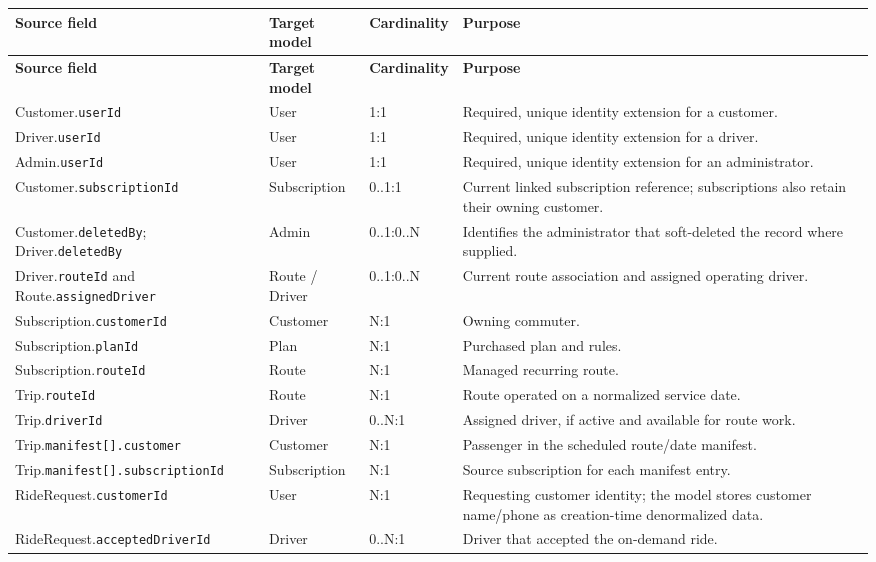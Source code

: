 \documentclass[11pt,a4paper]{article}
\newcommand{\code}[1]{\texttt{#1}}
\begin{document}
\begin{longtable}{p{} p{} p{} p{}}
\toprule
\textbf{Source field} & \textbf{Target model} & \textbf{Cardinality} & \textbf{Purpose} \\
\midrule
\endfirsthead
\toprule
\textbf{Source field} & \textbf{Target model} & \textbf{Cardinality} & \textbf{Purpose} \\
\midrule
\endhead
Customer.\code{userId} & User & 1:1 & Required, unique identity extension for a customer. \\
Driver.\code{userId} & User & 1:1 & Required, unique identity extension for a driver. \\
Admin.\code{userId} & User & 1:1 & Required, unique identity extension for an administrator. \\
Customer.\code{subscriptionId} & Subscription & 0..1:1 & Current linked subscription reference; subscriptions also retain their owning customer. \\
Customer.\code{deletedBy}; Driver.\code{deletedBy} & Admin & 0..1:0..N & Identifies the administrator that soft-deleted the record where supplied. \\
Driver.\code{routeId} and Route.\code{assignedDriver} & Route / Driver & 0..1:0..N & Current route association and assigned operating driver. \\
Subscription.\code{customerId} & Customer & N:1 & Owning commuter. \\
Subscription.\code{planId} & Plan & N:1 & Purchased plan and rules. \\
Subscription.\code{routeId} & Route & N:1 & Managed recurring route. \\
Trip.\code{routeId} & Route & N:1 & Route operated on a normalized service date. \\
Trip.\code{driverId} & Driver & 0..N:1 & Assigned driver, if active and available for route work. \\
Trip.\code{manifest[].customer} & Customer & N:1 & Passenger in the scheduled route/date manifest. \\
Trip.\code{manifest[].subscriptionId} & Subscription & N:1 & Source subscription for each manifest entry. \\
RideRequest.\code{customerId} & User & N:1 & Requesting customer identity; the model stores customer name/phone as creation-time denormalized data. \\
RideRequest.\code{acceptedDriverId} & Driver & 0..N:1 & Driver that accepted the on-demand ride. \\

\end{longtable}
\end{document}
